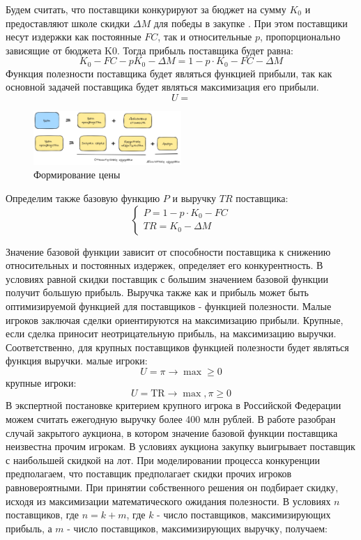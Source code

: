 Будем считать, что поставщики конкурируют за бюджет на сумму $K_0$ и 
предоставляют школе скидки $\Delta M$ для победы в закупке \cite{shubik1971game}.
 При этом поставщики несут издержки как постоянные $FC$, так и относительные $p$, пропорционально зависящие от бюджета K0. Тогда прибыль поставщика будет равна:
\begin{equation}
    K_0- FC- pK_0- \Delta M =1-p \cdot K_0 -FC- \Delta M   
\end{equation}
Функция полезности поставщика будет являться функцией прибыли, так как основной задачей поставщика будет являться максимизация его прибыли.
\begin{equation}
    U = 
\end{equation}



\begin{figure}[h]
    \centering
    \includegraphics[width=0.5\textwidth]{assets/settings/price_form.excalidraw.png}
    \caption{Формирование цены}
\end{figure}

Определим также базовую функцию $P$ и выручку $TR$ поставщика: 
\begin{equation}
    \begin{cases}
        P=1-p \cdot K_0 -FC  \\
        TR=K_0- \Delta M 
    \end{cases}
\end{equation}

Значение базовой функции зависит от способности поставщика к снижению относительных и постоянных издержек, определяет его конкурентность. В условиях равной скидки поставщик с большим значением базовой функции получит большую прибыль.
Выручка также как и прибыль может быть оптимизируемой функцией для поставщиков - функцией полезности. Малые игроков заключая сделки ориентируются на максимизацию прибыли. Крупные, если сделка приносит неотрицательную прибыль, на максимизацию выручки. Соответственно, для крупных поставщиков функцией полезности будет являться функция выручки. 
малые игроки:
$$
    U= \pi \rightarrow \max \ge 0
$$
крупные игроки: 
$$
    U = \text{TR} \rightarrow \max , \pi \ge 0
$$
В экспертной постановке критерием крупного игрока в Российской Федерации можем считать ежегодную выручку более 400 млн рублей.
В работе \cite{Bogdanov2023} разобран случай закрытого аукциона, в котором значение базовой функции поставщика неизвестна прочим игрокам. В условиях аукциона закупку выигрывает поставщик с наибольшей скидкой на лот. 
При моделировании процесса конкуренции предполагаем, что поставщик предполагает скидки прочих игроков равновероятными. При принятии собственного решения он подбирает скидку, исходя из максимизации математического ожидания полезности. В условиях $n$ поставщиков, где $n=k+m$, где $k$ - число поставщиков, максимизирующих прибыль, а $m$ - число поставщиков, максимизирующих выручку, получаем:


